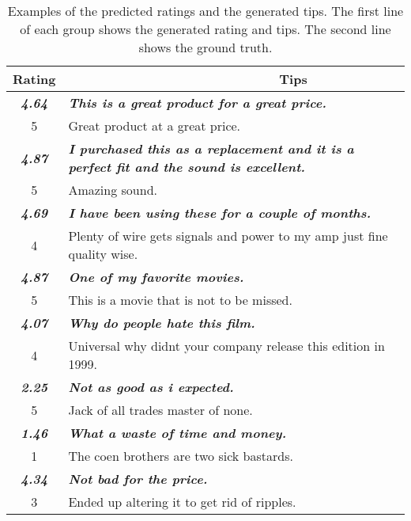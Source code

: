 \documentclass[sigconf]{acmart}
\begin{document}
\begin{table}[!t]
	\centering
	\caption{Examples of the predicted ratings and the generated tips. The first line of each group shows the generated rating and tips.
		The second line shows the ground truth.}%
	\label{tbl:case}%
	\begin{tabular}{ c | p{6.4cm}}
		\hline
		\textbf{Rating} & \ \ \ \ \ \  \  \ \ \ \ \ \ \ \ \ \ \ \ \ \ \ \ \ \ \ \ \ \ \textbf{Tips} \\
		\hline
		\textbf{\textit{4.64}} & \textbf{\textit{This is a great product for a great price.}} \\
		5 & Great product at a great price.  \\
		
		\hline
		\textbf{\textit{4.87}} &\textbf{\textit{ I purchased this as a replacement and it is a perfect fit and the sound is excellent.}} \\
		5 & Amazing sound.  \\
		
		\hline
		\textbf{\textit{4.69}} &\textbf{\textit{ I have been using these for a couple of months.}} \\
		4 & Plenty of wire gets signals and power to my amp just fine quality wise.  \\
		
		\hline
		\textbf{\textit{4.87}} &\textbf{\textit{ One of my favorite movies.}} \\
		5 & This is a movie that is not to be missed.  \\
		
		
		
		\hline
		\textbf{\textit{4.07}} &\textbf{\textit{ Why do people hate this film.}} \\ 4 & Universal why didnt your company release this edition in 1999. \\
		
		\hline
		\textbf{\textit{2.25}} &\textbf{\textit{ Not as good as i expected.}} \\ 5 & Jack of all trades master of none. \\
		
		\hline
		\textbf{\textit{1.46}} &\textbf{\textit{ What a waste of time and money.}} \\ 1 & The coen brothers are two sick bastards.  \\
		\hline
		\hline
		
		\textbf{\textit{4.34}} & \textbf{\textit{Not bad for the price.}} \\
		3 & Ended up altering it to get rid of ripples. \\
		
		
		\hline
	\end{tabular}
	\vspace{-3mm}
\end{table}
\end{document}
